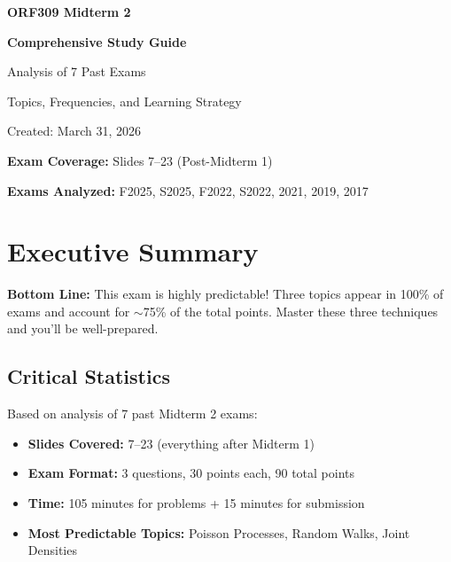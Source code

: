 \documentclass[11pt,letterpaper]{article}
\begin{document}
\begin{titlepage}
\centering
\vspace*{2cm}

{\Huge\bfseries ORF309 Midterm 2\par}
\vspace{0.5cm}
{\LARGE\bfseries Comprehensive Study Guide\par}
\vspace{2cm}

{\Large Analysis of 7 Past Exams\par}
\vspace{0.3cm}
{\large Topics, Frequencies, and Learning Strategy\par}

\vspace{3cm}

{\large Created: March 31, 2026\par}

\vfill

{\large\textbf{Exam Coverage:} Slides 7--23 (Post-Midterm 1)\par}
\vspace{0.5cm}
{\large\textbf{Exams Analyzed:} F2025, S2025, F2022, S2022, 2021, 2019, 2017\par}

\end{titlepage}

\tableofcontents
\newpage

\section{Executive Summary}

\begin{tipbox}
\textbf{Bottom Line:} This exam is highly predictable! Three topics appear in 100\% of exams and account for $\sim$75\% of the total points. Master these three techniques and you'll be well-prepared.
\end{tipbox}

\subsection{Critical Statistics}

Based on analysis of 7 past Midterm 2 exams:

\begin{itemize}[leftmargin=*]
  \item \textbf{Slides Covered:} 7--23 (everything after Midterm 1)
  \item \textbf{Exam Format:} 3 questions, 30 points each, 90 total points
  \item \textbf{Time:} 105 minutes for problems + 15 minutes for submission
  \item \textbf{Most Predictable Topics:} Poisson Processes, Random Walks, Joint Densities
\end{itemize}
\end{document}
